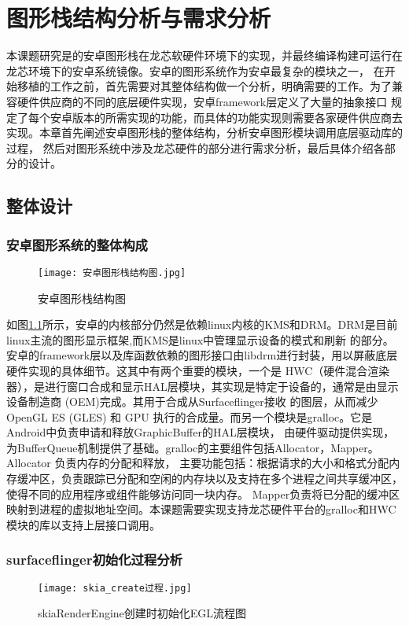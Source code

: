 
\chapter{图形栈结构分析与需求分析}
本课题研究是的安卓图形栈在龙芯软硬件环境下的实现，并最终编译构建可运行在龙芯环境下的安卓系统镜像。安卓的图形系统作为安卓最复杂的模块之一，
在开始移植的工作之前，首先需要对其整体结构做一个分析，明确需要的工作。为了兼容硬件供应商的不同的底层硬件实现，安卓framework层定义了大量的抽象接口
规定了每个安卓版本的所需实现的功能，而具体的功能实现则需要各家硬件供应商去实现。本章首先阐述安卓图形栈的整体结构，分析安卓图形模块调用底层驱动库的过程，
然后对图形系统中涉及龙芯硬件的部分进行需求分析，最后具体介绍各部分的设计。
\section{整体设计}
\subsection{安卓图形系统的整体构成}
\begin{figure}[h]
  \centering
  \texttt{[image: 安卓图形栈结构图.jpg]}
  \caption{安卓图形栈结构图}
  \label{fig:安卓图形栈结构图}
\end{figure}
如图\ref{fig:安卓图形栈结构图}所示，安卓的内核部分仍然是依赖linux内核的KMS和DRM。DRM是目前linux主流的图形显示框架,而KMS是linux中管理显示设备的模式和刷新
的部分。安卓的framework层以及库函数依赖的图形接口由libdrm进行封装，用以屏蔽底层硬件实现的具体细节。这其中有两个重要的模块，一个是
HWC（硬件混合渲染器），是进行窗口合成和显示HAL层模块，其实现是特定于设备的，通常是由显示设备制造商 (OEM)完成。其用于合成从Surfaceflinger接收
的图层，从而减少OpenGL ES (GLES) 和 GPU 执行的合成量。而另一个模块是gralloc。它是Android中负责申请和释放GraphicBuffer的HAL层模块，
由硬件驱动提供实现，为BufferQueue机制提供了基础。gralloc的主要组件包括Allocator，Mapper。Allocator 负责内存的分配和释放，
主要功能包括：根据请求的大小和格式分配内存缓冲区，负责跟踪已分配和空闲的内存块以及支持在多个进程之间共享缓冲区，使得不同的应用程序或组件能够访问同一块内存。
Mapper负责将已分配的缓冲区映射到进程的虚拟地址空间。本课题需要实现支持龙芯硬件平台的gralloc和HWC模块的库以支持上层接口调用。

\subsection{surfaceflinger初始化过程分析}
\begin{figure}[h]
  \centering
  \texttt{[image: skia\_create过程.jpg]}
  \caption{skiaRenderEngine创建时初始化EGL流程图}
\end{figure}

